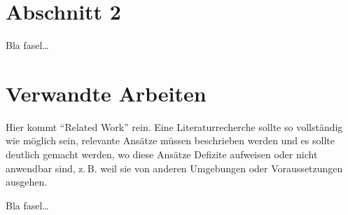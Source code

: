 \section{Abschnitt 2}
\label{ch:Grundlagen:sec:Abschnitt2}

Bla fasel\ldots

\section{Verwandte Arbeiten}
\label{ch:Grundlagen:sec:RelatedWork}
Hier kommt "`Related Work"' rein.
Eine Literaturrecherche sollte so vollständig wie möglich sein,
relevante Ansätze müssen beschrieben werden und es sollte deutlich 
gemacht werden, wo diese Ansätze Defizite aufweisen oder nicht
anwendbar sind, z.\,B. weil sie von anderen Umgebungen oder 
Voraussetzungen ausgehen.


Bla fasel\ldots

